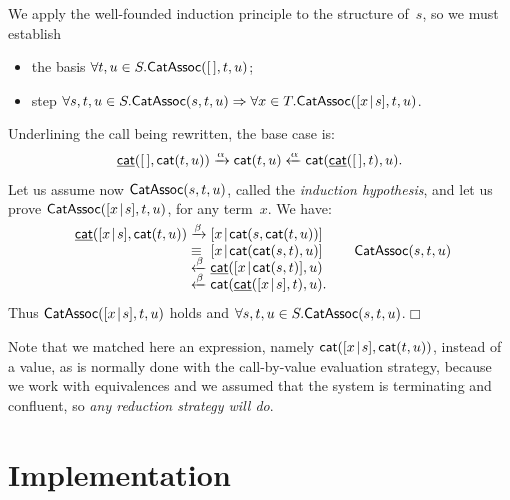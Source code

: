 We apply the well\hyp{}founded induction principle to the structure
of~\(s\), so we must establish
\begin{itemize}

  \item the basis \(\forall t,u \in S.\textsf{CatAssoc}({[\,],t,u})\);

  \item step \(\forall s,t,u \in S.\textsf{CatAssoc}({s,t,u})
    \Rightarrow \forall x \in T.\textsf{CatAssoc}({[{x}\!\mid\!{s}],t,u})\).

\end{itemize}
Underlining the call being rewritten, the base case is:
\begin{equation*}
  \ufun{cat}(\el,\fun{cat}(t,u))
    \xrightarrow{\smash{\alpha}} \fun{cat}(t,u)
    \xleftarrow{\smash{\alpha}} \fun{cat}(\ufun{cat}(\el,t),u).
\index{cat@\fun{cat/2}}
\end{equation*}
Let us assume now \(\textsf{CatAssoc}({s,t,u})\), called the
\emph{induction hypothesis}, and
let us prove
\(\textsf{CatAssoc}({[{x}\!\mid\!{s}],t,u})\),
for any term~\(x\). We have:
\begin{equation*}
\begin{array}{r@{\;}l@{\;}l@{\qquad}r@{}}
  \ufun{cat}(\cons{x}{s},\fun{cat}(t,u))
& \xrightarrow{\smash\beta}
& \cons{x}{\fun{cat}(s,\fun{cat}(t,u))}\\
& \equiv
& \cons{x}{\fun{cat}(\fun{cat}(s,t),u)}
& \IH{\pred{CatAssoc}{s,t,u}}\\
& \xleftarrow{\smash\beta}
& \ufun{cat}(\cons{x}{\fun{cat}(s,t)},u)\\
& \xleftarrow{\smash\beta}
& \fun{cat}(\ufun{cat}(\cons{x}{s},t),u).\index{cat@\fun{cat/2}}
\end{array}
\end{equation*}
Thus
\(\textsf{CatAssoc}({[{x}\!\mid\!{s}],t,u})\) holds and \(\forall s,t,u \in
S.\textsf{CatAssoc}({s,t,u})\).\hfill\(\Box\)

Note that we matched here an expression, namely
\(\textsf{cat}([{x}\!\mid\!{s}],\textsf{cat}(t,u))\), instead of a value, as is
normally done with the call\hyp{}by\hyp{}value evaluation strategy,
because we work with equivalences and we assumed that the system is
terminating and confluent, so \emph{any reduction strategy will do}.


\section{Implementation}
\label{sec:implementation}

